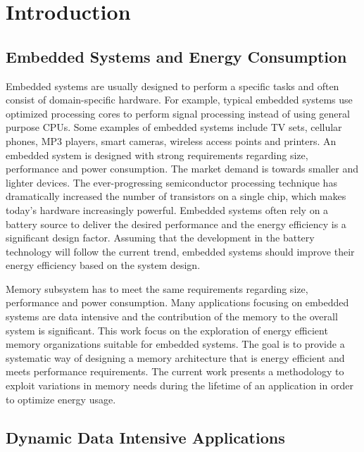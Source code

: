 \chapter{Introduction}
\label{intro}


\section{Embedded Systems and Energy Consumption}

Embedded systems are usually designed to perform a specific tasks and often consist of domain-specific hardware.
For example, typical embedded systems use optimized processing cores to perform signal processing instead of using general purpose CPUs.
Some examples of embedded systems include TV sets, cellular phones, MP3 players, smart cameras, wireless access points and printers. 
An embedded system is designed with strong requirements regarding size, performance and power consumption.
The market demand is towards smaller and lighter devices.
The ever-progressing semiconductor processing technique has dramatically increased the number of transistors on a single chip, which makes today's hardware increasingly powerful.
Embedded systems often rely on a battery source to deliver the desired performance and the energy efficiency is a significant design factor.
Assuming that the development in the battery technology will follow the current trend, embedded systems should improve their energy efficiency based on the system design.

Memory subsystem has to meet the same requirements regarding size, performance and power consumption.
Many applications focusing on embedded systems are data intensive and the contribution of the memory to the overall system is significant.
This work focus on the exploration of energy efficient memory organizations suitable for embedded systems.
The goal is to provide a systematic way of designing a memory architecture that is energy efficient and meets performance requirements.
The current work presents a methodology to exploit variations in memory needs during the lifetime of an application in order to optimize energy usage.

\section{Dynamic Data Intensive Applications}

